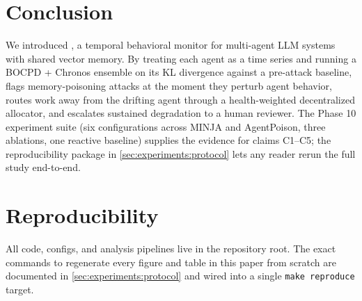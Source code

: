 \section{Conclusion}
\label{sec:conclusion}

We introduced \sys{}, a temporal behavioral monitor for multi-agent
LLM systems with shared vector memory. By treating each agent as a
time series and running a BOCPD + Chronos ensemble on its KL
divergence against a pre-attack baseline, \sys{} flags
memory-poisoning attacks at the moment they perturb agent behavior,
routes work away from the drifting agent through a health-weighted
decentralized allocator, and escalates sustained degradation to a
human reviewer. The Phase 10 experiment suite (six configurations
across MINJA and AgentPoison, three ablations, one reactive baseline)
supplies the evidence for claims C1--C5; the reproducibility package
in \cref{sec:experiments:protocol} lets any reader rerun the full
study end-to-end.

\section*{Reproducibility}
\label{sec:reproducibility}

All code, configs, and analysis pipelines live in the repository root.
The exact commands to regenerate every figure and table in this paper
from scratch are documented in \cref{sec:experiments:protocol} and
wired into a single \texttt{make reproduce} target.
